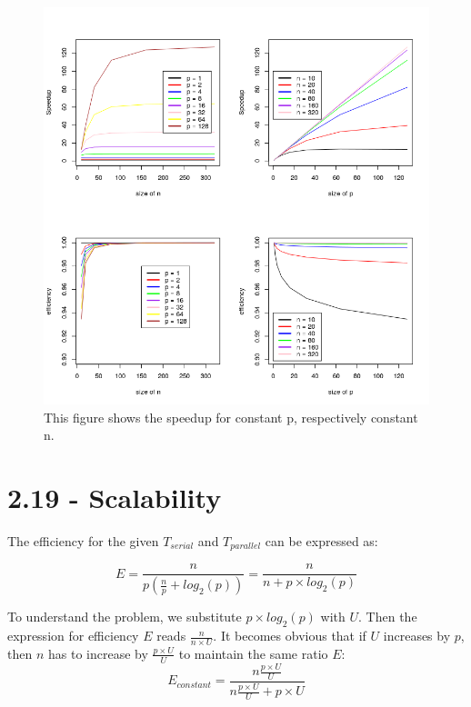 \documentclass[a4paper,11pt,twoside]{article}
\begin{document}
\begin{figure}
  
  \centering
    \includegraphics[width=1\textwidth]{speedup.png}
    \caption{This figure shows the speedup for constant p, respectively constant n.}
    \label{fig:speedup}
\end{figure}

\section{2.19 - Scalability}
The efficiency for the given $T_{serial}$ and $T_{parallel}$ can be expressed as:

\begin{equation*}
E = \frac{n}{p (\frac{n}{p} + log_{2}(p))} = \frac{n}{n + p \times log_{2}(p)}   
\end{equation*}

To understand the problem, we substitute $p \times log_{2}(p)$ with $U$. Then the expression for efficiency $E$ reads $\frac{n}{n \times U}$. It becomes obvious that if $U$ increases by $p$, then $n$ has to increase by $\frac{p \times U}{U}$ to maintain the same ratio $E$:
\begin{equation*}
E_{constant} = \frac{n \frac{p \times U}{U}}{n \frac{p \times U}{U} + {p \times U}}
\end{equation*}
\end{document}
